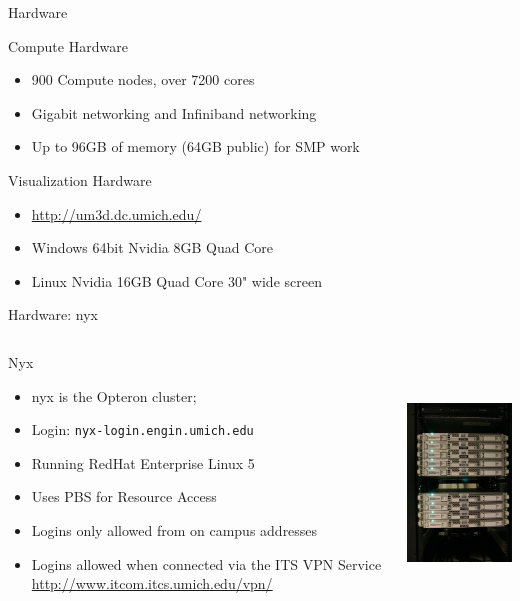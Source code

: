 \documentclass[handout]{beamer}
\begin{document}
  \begin{frame}{Hardware}
   \begin{block}{Compute Hardware}
    \begin{itemize}
    \item 900 Compute nodes, over 7200 cores
    \item Gigabit networking and Infiniband networking
    \item Up to 96GB of memory (64GB public) for SMP work
    \end{itemize}
   \end{block}
   \begin{block}{Visualization Hardware}
    \begin{itemize}
     \item \url{http://um3d.dc.umich.edu/}
     \item Windows 64bit Nvidia 8GB Quad Core
     \item Linux Nvidia 16GB Quad Core 30" wide screen
    \end{itemize}
   \end{block}
  \end{frame}
  \begin{frame}{Hardware: nyx}
   \begin{columns}[c]
   \begin{column}{7cm}
    \begin{block}{Nyx}
    \begin{itemize}
    \item nyx is the Opteron cluster;
    \item Login: \texttt{nyx-login.engin.umich.edu}
    \item Running RedHat Enterprise Linux 5
    \item Uses PBS for Resource Access
    \item Logins only allowed from on campus addresses
    \item Logins allowed when connected via the ITS VPN Service \url{http://www.itcom.itcs.umich.edu/vpn/}
    \end{itemize}
   \end{block}
   \end{column}
   \begin{column}{5cm}
    \begin{center}\includegraphics[height=2.7in]{nyx}\end{center}
   \end{column}
  \end{columns}
  \end{frame}
\end{document}

